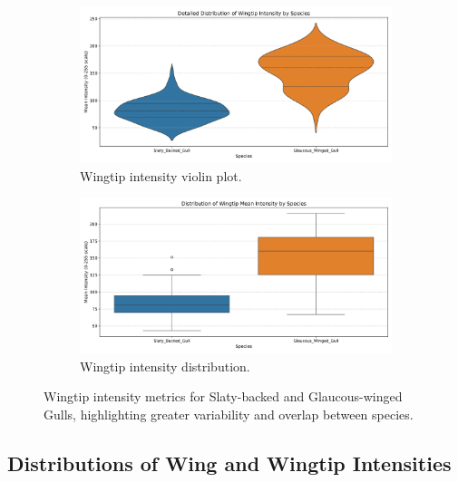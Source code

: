 \documentclass[a4paper,12pt]{report}
\begin{document}
\begin{figure}[H]
    \centering
    \begin{subfigure}[b]{0.44\textwidth}
        \centering
        \includegraphics[width=\textwidth]{images/REPORT_IMAGES_INTENSITY/I2/wingtip_intensity_violin_plot.png}
        \caption{Wingtip intensity violin plot.}
        \label{fig:wingtip_intensity_violin}
    \end{subfigure}
    \hfill
    \begin{subfigure}[b]{0.44\textwidth}
        \centering
        \includegraphics[width=\textwidth]{images/REPORT_IMAGES_INTENSITY/I2/wingtip_intensity_distribution.png}
        \caption{Wingtip intensity distribution.}
        \label{fig:wingtip_intensity_distribution}
    \end{subfigure}
    \caption{Wingtip intensity metrics for Slaty-backed and Glaucous-winged Gulls, highlighting greater variability and overlap between species.}
    \label{fig:wingtip_intensity_combined}
\end{figure}


\subsection{Distributions of Wing and Wingtip Intensities}
\end{document}
